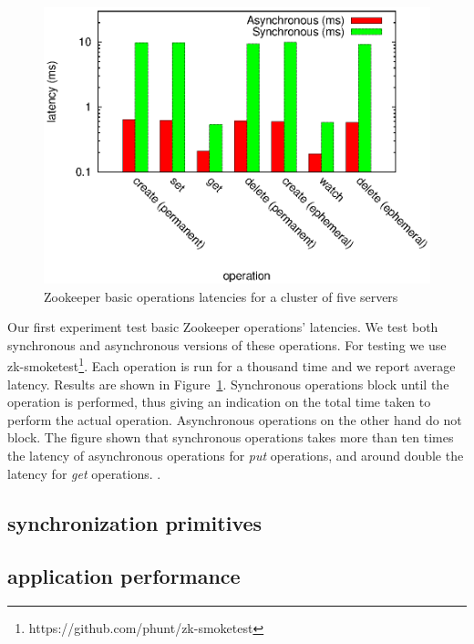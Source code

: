 \begin{figure}[h]
\centering
\includegraphics[scale=0.75]{img/ops_latencies_logscale.eps}
\caption{Zookeeper basic operations latencies for a cluster of five servers}
\label{fig:ops_latencies}
\end{figure}

Our first experiment test basic Zookeeper operations' latencies. We test both synchronous and asynchronous versions of these operations. For testing we use zk-smoketest\footnote{https://github.com/phunt/zk-smoketest}. Each operation is run for a thousand time and we report average latency. Results are shown in Figure~\ref{fig:ops_latencies}. Synchronous operations block until the operation is performed, thus giving an indication on the total time taken to perform the actual operation. Asynchronous operations on the other hand do not block. The figure shown that synchronous operations takes more than ten times the latency of asynchronous operations for \emph{put} operations, and around double the latency for \emph{get} operations. . 

\subsection{synchronization primitives}

\subsection{application performance}

